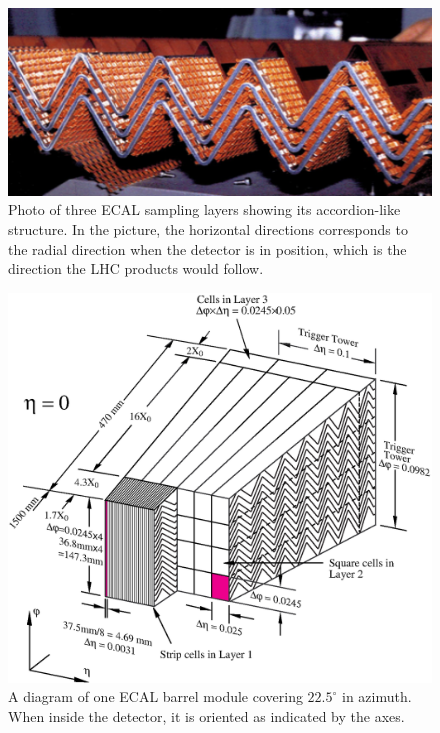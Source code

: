\begin{figure}[ht]
\centering
\includegraphics[width=.7\textwidth]{figures/atlas/emcal_accordion.png}
\caption{Photo of three ECAL sampling layers
showing its accordion-like structure. In the picture, 
the horizontal directions corresponds to 
the radial direction when the detector is in position, which is
the direction the LHC products would follow.}
\label{fig:atlas_emcal_accordion}
\end{figure}

\begin{figure}[ht]
\centering
\includegraphics[width=.8\textwidth]{figures/atlas/emcal_barrel_module.eps}
\caption{ A diagram of one ECAL barrel module 
covering $22.5^{\circ}$ in azimuth. When inside the detector,
it is oriented as indicated by the axes.}
\label{fig:atlas_emcal_module}
\end{figure}

